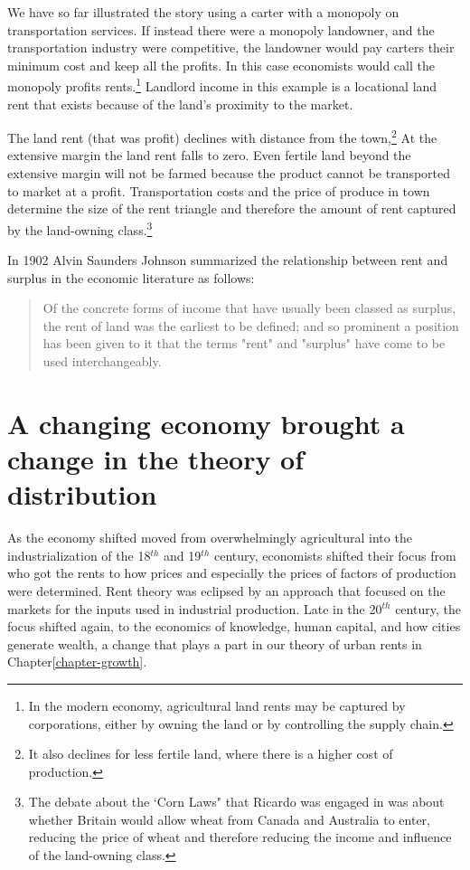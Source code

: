 We have so far illustrated the story using a carter with a monopoly on transportation services. If instead there were a monopoly landowner, and the transportation industry were competitive, the landowner would pay carters their minimum cost and keep all the profits. In this case economists would call the monopoly profits rents.\footnote{In the modern economy, agricultural land rents may be captured by corporations,  either by owning the land or by controlling the supply chain.}  Landlord income in this example is a locational land rent that exists because of the land's proximity to the market.  

The land rent (that was profit) declines with distance from the town,\footnote{%
It also declines for less fertile land, where there is a higher cost of production.} At the extensive margin the land rent falls to zero. Even fertile land beyond the extensive margin will not be farmed because the product cannot be transported to market at a profit. Transportation costs and the price of produce in town determine the size of the  rent triangle and therefore the amount of rent captured by the land-owning class.\footnote{The debate about the  `Corn Laws" that Ricardo  was engaged in was about whether Britain would allow wheat from Canada and Australia to enter, reducing the price of wheat and therefore reducing the income and influence of the land-owning class.} 


In 1902 Alvin Saunders Johnson \cite{johnsonRentModernEconomic1902} summarized the relationship between rent and surplus in the economic literature as follows: 

\begin{quotation}Of the concrete forms of income that have usually been classed as surplus, the rent of land was the earliest to be defined; and so prominent a position has been given to it that the terms "rent" and "surplus" have come to be used interchangeably.\end{quotation} 

\section{A changing economy brought a change in the theory of distribution}
As the economy shifted  moved from overwhelmingly  agricultural into the industrialization of the 18$^{th}$  and 19$^{th}$ century, economists shifted their focus from who got the rents to how prices and especially the prices of factors of production were determined. Rent theory was eclipsed by an approach that focused on the markets for the inputs used in industrial production.  Late in the 20$^{th}$ century, the focus shifted again, to the economics of  knowledge, human capital, and how cities generate wealth, a change that plays a part in  our theory of urban rents in Chapter\ref{chapter-growth}. 
 
